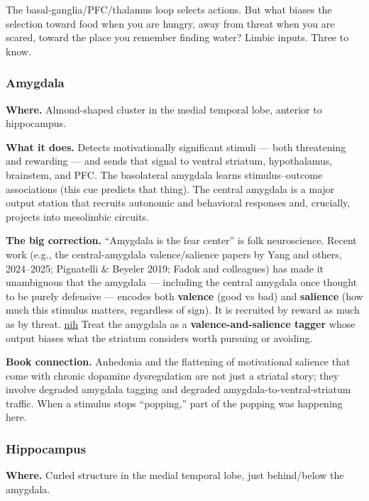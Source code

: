 The basal-ganglia/PFC/thalamus loop selects actions. But what biases the selection toward food when you are hungry, away from threat when you are scared, toward the place you remember finding water? Limbic inputs. Three to know.

\subsubsection{Amygdala}\label{06_neurology_101-amygdala}

\textbf{Where.} Almond-shaped cluster in the medial temporal lobe, anterior to hippocampus.

\textbf{What it does.} Detects motivationally significant stimuli --- both threatening and rewarding --- and sends that signal to ventral striatum, hypothalamus, brainstem, and PFC. The basolateral amygdala learns stimulus--outcome associations (this cue predicts that thing). The central amygdala is a major output station that recruits autonomic and behavioral responses and, crucially, projects into mesolimbic circuits.

\textbf{The big correction.} ``Amygdala is the fear center'' is folk neuroscience. Recent work (e.g., the central-amygdala valence/salience papers by Yang and others, 2024--2025; Pignatelli \& Beyeler 2019; Fadok and colleagues) has made it unambiguous that the amygdala --- including the central amygdala once thought to be purely defensive --- encodes both \textbf{valence} (good vs bad) and \textbf{salience} (how much this stimulus matters, regardless of sign). It is recruited by reward as much as by threat. \href{https://www.ncbi.nlm.nih.gov/pmc/articles/PMC11723578/}{nih} Treat the amygdala as a \textbf{valence-and-salience tagger} whose output biases what the striatum considers worth pursuing or avoiding.

\textbf{Book connection.} Anhedonia and the flattening of motivational salience that come with chronic dopamine dysregulation are not just a striatal story; they involve degraded amygdala tagging and degraded amygdala-to-ventral-striatum traffic. When a stimulus stops ``popping,'' part of the popping was happening here.

\subsubsection{Hippocampus}\label{06_neurology_101-hippocampus}

\textbf{Where.} Curled structure in the medial temporal lobe, just behind/below the amygdala.

